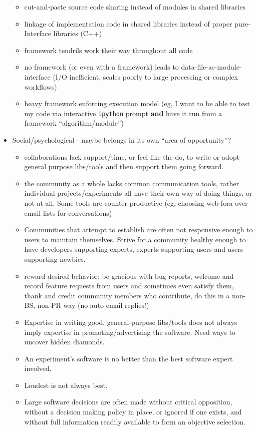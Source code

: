 \begin{itemize}
\begin{itemize}
  \item cut-and-paste source code sharing instead of modules in shared libraries
  \item linkage of implementation code in shared libraries instead of proper pure-Interface libraries (C++)
  \item framework tendrils work their way throughout all code
  \item no framework (or even with a framework) leads to data-file-as-module-interface (I/O inefficient, scales poorly to large processing or complex workflows)
  \item heavy framework enforcing execution model (eg, I want to be
    able to test my code via interactive \texttt{ipython} prompt
    \textbf{and} have it run from a framework ``algorithm/module'')
  \end{itemize}
\item Social/psychological - maybe belongs in its own ``area of opportunity''?
  \begin{itemize}
\item collaborations lack support/time, or feel like the do, to write or adopt general purpose libs/tools and then support them going forward.
\item the community as a whole lacks common communication tools, rather individual projects/experiments all have their own way of doing things, or not at all.  Some tools are counter productive (eg, choosing web fora over email lists for conversations)
\item Communities that attempt to establish are often not responsive enough to users to maintain themselves.  Strive for a community healthy enough to have developers supporting experts, experts supporting users and users supporting newbies.
\item reward desired behavior: be gracious with bug reports, welcome and record feature requests from users and sometimes even satisfy them, thank and credit community members who contribute, do this in a non-BS, non-PR way (no auto email replies!)
\item Expertise in writing good, general-purpose libs/tools does not always imply expertise in promoting/advertising the software.  Need ways to uncover hidden diamonds.
\item An experiment's software is no better than the best software expert involved.
\item Loudest is not always best.
\item Large software decisions are often made without critical opposition, without a decision making policy in place, or ignored if one exists, and without full information readily available to form an objective selection.

\end{itemize}
\end{itemize}
